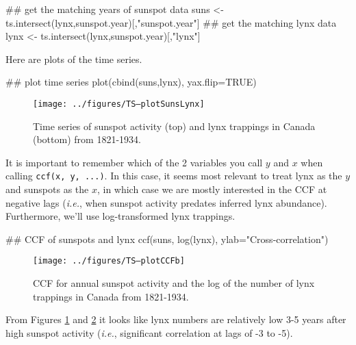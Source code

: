 \begin{Schunk}
\begin{Sinput}
 ## get the matching years of sunspot data
 suns <- ts.intersect(lynx,sunspot.year)[,"sunspot.year"]
 ## get the matching lynx data
 lynx <- ts.intersect(lynx,sunspot.year)[,"lynx"]
\end{Sinput}
\end{Schunk}

Here are plots of the time series.

\begin{Schunk}
\begin{Sinput}
 ## plot time series
 plot(cbind(suns,lynx), yax.flip=TRUE)
\end{Sinput}
\end{Schunk}

\begin{figure}[htp]
\begin{center}
\texttt{[image: ../figures/TS--plotSunsLynx]}
\end{center}
\caption{Time series of sunspot activity (top) and lynx trappings in Canada (bottom) from 1821-1934.}
\label{fig:LW1.SunsLynx}
\end{figure}


It is important to remember which of the 2 variables you call $y$ and $x$ when calling \texttt{ccf(x, y, ...)}.  In this case, it seems most relevant to treat lynx as the $y$ and sunspots as the $x$, in which case we are mostly interested in the CCF at negative lags (\emph{i.e.}, when sunspot activity predates inferred lynx abundance).  Furthermore, we'll use log-transformed lynx trappings.

\begin{Schunk}
\begin{Sinput}
 ## CCF of sunspots and lynx
 ccf(suns, log(lynx), ylab="Cross-correlation")
\end{Sinput}
\end{Schunk}

\begin{figure}[htp]
\begin{center}
\texttt{[image: ../figures/TS--plotCCFb]}
\end{center}
\caption{CCF for annual sunspot activity and the log of the number of lynx trappings in Canada from 1821-1934.}
\label{fig:LW1.figCCFLynxSun}
\end{figure}

From Figures \ref{fig:LW1.SunsLynx} and \ref{fig:LW1.figCCFLynxSun} it looks like lynx numbers are relatively low 3-5 years after high sunspot activity (\emph{i.e.}, significant correlation at lags of -3 to -5).


